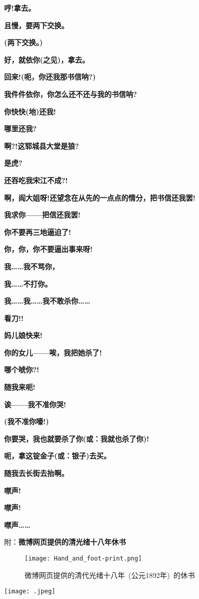 \textbf{哼!拿去。}

\textbf{且慢，要两下交换。}

\textbf{(两下交换。)}

\textbf{好，就依你(之见)，拿去。}

\textbf{回来!(呃，你还我那书信呐?)}

\textbf{我件件依你，你怎么还不还与我的书信呐?}

\textbf{你快快(地)还我!}

\textbf{哪里还我?}

\textbf{啊?!这郓城县大堂是狼?}

\textbf{是虎?}

\textbf{还吞吃我宋江不成?!}

\textbf{啊，阎大姐呀!还望念在从先的一点点的情分，把书信还我罢!}

\textbf{我求你------把信还我罢!}

\textbf{你不要再三地逼迫了!}

\textbf{你，你，你不要逼出事来呀!}

\textbf{我\ldots{}\ldots{}我不骂你，}

\textbf{我\ldots{}\ldots{}不打你。}

\textbf{我\ldots{}\ldots{}我\ldots{}\ldots{}我不敢杀你\ldots{}\ldots{}}

\textbf{看刀!!}

\textbf{妈儿娘快来!}

\textbf{你的女儿------唉，我把她杀了!}

\textbf{哪个唬你?!}

\textbf{随我来呃!}

\textbf{诶------我不准你哭!}

\textbf{(我不准你嚎!)}

\textbf{你要哭，我也就要杀了你(或：我就也杀了你)!}

\textbf{呃，拿这锭金子(或：银子)去买。}

\textbf{随我去长街去抬啊。}

\textbf{噤声!}

\textbf{噤声!}

\textbf{噤声\ldots{}\ldots{}}

\vskip 5pt
附：\textbf{微博网页提供的清光绪十八年休书}
\begin{figure}[h!]
\centering
\texttt{[image: Hand\_and\_foot-print.png]}
\caption*{\hei 微博网页提供的清代光绪十八年~(公元1892年)~的休书}
\label{Collect_Liu_Wu}
\end{figure}
\texttt{[image: .jpeg]}

